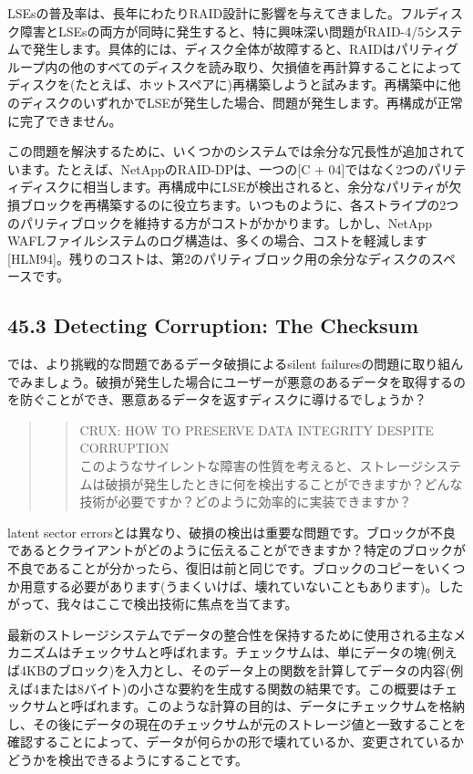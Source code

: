 LSEsの普及率は、長年にわたりRAID設計に影響を与えてきました。フルディスク障害とLSEsの両方が同時に発生すると、特に興味深い問題がRAID-4/5システムで発生します。具体的には、ディスク全体が故障すると、RAIDはパリティグループ内の他のすべてのディスクを読み取り、欠損値を再計算することによってディスクを(たとえば、ホットスペアに)再構築しようと試みます。再構築中に他のディスクのいずれかでLSEが発生した場合、問題が発生します。再構成が正常に完了できません。

この問題を解決するために、いくつかのシステムでは余分な冗長性が追加されています。たとえば、NetAppのRAID-DPは、一つの{[}C
+
04{]}ではなく2つのパリティディスクに相当します。再構成中にLSEが検出されると、余分なパリティが欠損ブロックを再構築するのに役立ちます。いつものように、各ストライプの2つのパリティブロックを維持する方がコストがかかります。しかし、NetApp
WAFLファイルシステムのログ構造は、多くの場合、コストを軽減します{[}HLM94{]}。残りのコストは、第2のパリティブロック用の余分なディスクのスペースです。

\hypertarget{detecting-corruption-the-checksum}{%
\subsection*{45.3 Detecting Corruption: The
Checksum}\label{detecting-corruption-the-checksum}}

では、より挑戦的な問題であるデータ破損によるsilent
failuresの問題に取り組んでみましょう。破損が発生した場合にユーザーが悪意のあるデータを取得するのを防ぐことができ、悪意あるデータを返すディスクに導けるでしょうか？

\begin{quote}
\begin{quote}
CRUX: HOW TO PRESERVE DATA INTEGRITY DESPITE CORRUPTION\\
このようなサイレントな障害の性質を考えると、ストレージシステムは破損が発生したときに何を検出することができますか？どんな技術が必要ですか？どのように効率的に実装できますか？
\end{quote}
\end{quote}

latent sector
errorsとは異なり、破損の検出は重要な問題です。ブロックが不良であるとクライアントがどのように伝えることができますか？特定のブロックが不良であることが分かったら、復旧は前と同じです。ブロックのコピーをいくつか用意する必要があります(うまくいけば、壊れていないこともあります)。したがって、我々はここで検出技術に焦点を当てます。

最新のストレージシステムでデータの整合性を保持するために使用される主なメカニズムはチェックサムと呼ばれます。チェックサムは、単にデータの塊(例えば4KBのブロック)を入力とし、そのデータ上の関数を計算してデータの内容(例えば4または8バイト)の小さな要約を生成する関数の結果です。この概要はチェックサムと呼ばれます。このような計算の目的は、データにチェックサムを格納し、その後にデータの現在のチェックサムが元のストレージ値と一致することを確認することによって、データが何らかの形で壊れているか、変更されているかどうかを検出できるようにすることです。

